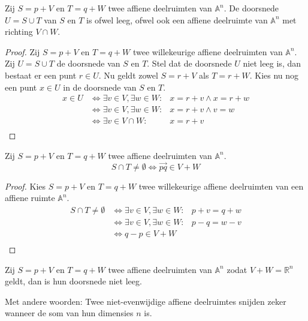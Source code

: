 \documentclass[main.tex]{subfiles}
\begin{document}
\begin{st}
\label{st:affiene-doorsnede-ruimte}
  Zij $S = p + V$ en $T = q + W$ twee affiene deelruimten van $\mathbb{A}^{n}$.
  De doorsnede $U = S \cup T$ van $S$ en $T$ is ofwel leeg, ofwel ook een affiene deelruimte van $\mathbb{A}^{n}$ met richting $V \cap W$.

  \begin{proof}
    Zij $S = p + V$ en $T = q + W$ twee willekeurige affiene deelruimten van $\mathbb{A}^{n}$.
    Zij $U = S \cup T$ de doorsnede van $S$ en $T$.
    Stel dat de doorsnede $U$ niet leeg is, dan bestaat er een punt $r \in U$. Nu geldt zowel $S = r + V$ als $T = r + W$. Kies nu nog een punt $x \in U$ in de doorsnede van $S$ en $T$.
    \[
    \begin{array}{cll}
      x \in U &\Leftrightarrow \exists v \in V, \exists w \in W:& x = r + v \wedge x = r + w\\
              &\Leftrightarrow \exists v \in V, \exists w \in W:& x = r + v \wedge v = w\\
              &\Leftrightarrow \exists v \in V \cap W:& x = r + v\\
    \end{array}
    \]
  \end{proof}
\end{st}


\begin{st}
  Zij $S = p + V$ en $T = q + W$ twee affiene deelruimten van $\mathbb{A}^{n}$.
  \[ S \cap T \neq \emptyset \Leftrightarrow \overrightarrow{pq} \in V + W \]

  \begin{proof}
    Kies $S = p + V$ en $T = q + W$ twee willekeurige affiene deelruimten van een affiene ruimte $\mathbb{A}^{n}$.
    \[
    \begin{array}{cll}
      S \cap T \neq \emptyset &\Leftrightarrow \exists v \in V, \exists w \in W:& p + v = q + w\\
                              &\Leftrightarrow \exists v \in V, \exists w \in W:& p - q = w - v\\
                              &\Leftrightarrow q - p \in V + W\\
    \end{array}
    \]
  \end{proof}
\end{st}

\begin{gev}
  \label{gev:deelruimten-niet-leeg-dimensie-n}
  Zij $S = p + V$ en $T = q + W$ twee affiene deelruimten van $\mathbb{A}^{n}$ zodat $V + W = \mathbb{R}^{n}$ geldt, dan is hun doorsnede niet leeg.

  Met andere woorden: Twee niet-evenwijdige affiene deelruimtes snijden zeker wanneer de som van hun dimensies $n$ is.
\end{gev}
\end{document}
